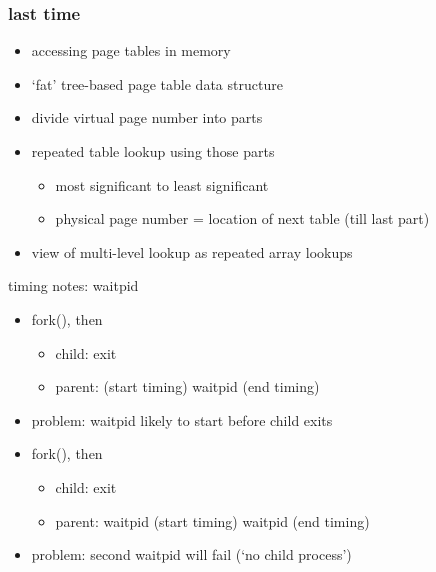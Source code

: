 \date{}
\title{}
\date{}

\begin{frame}
    \titlepage
\end{frame}






\begin{frame}
\frametitle{last time}
\begin{itemize}
    \item accessing page tables in memory
    \item `fat' tree-based page table data structure
    \item divide virtual page number into parts
    \item repeated table lookup using those parts
        \begin{itemize}
        \item most significant to least significant
        \item physical page number = location of next table (till last part)
        \end{itemize}
    \item view of multi-level lookup as repeated array lookups
\end{itemize}
\end{frame}

\begin{frame}{timing notes: waitpid}
    \begin{itemize}
        \item fork(), then
            \begin{itemize}
            \item child: exit
            \item parent: (start timing) waitpid (end timing)
            \end{itemize}
        \item problem: waitpid likely to start before child exits
        \vspace{.5cm}
        \item fork(), then
            \begin{itemize}
            \item child: exit
            \item parent: waitpid (start timing) waitpid (end timing)
            \end{itemize}
        \item problem: second waitpid will fail (`no child process')
    \end{itemize}
\end{frame}

